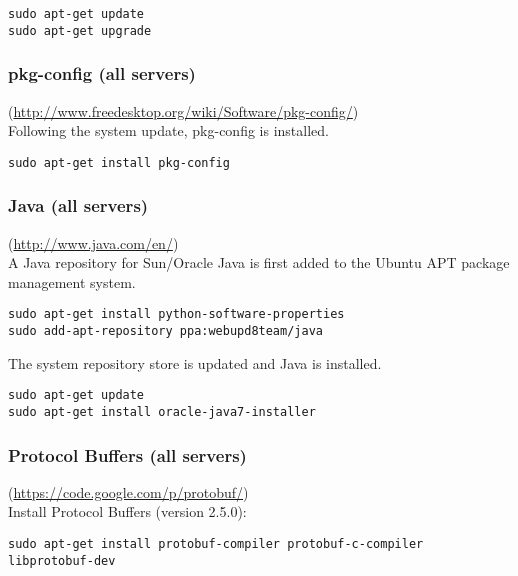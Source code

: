 \begin{verbatim}
sudo apt-get update
sudo apt-get upgrade
\end{verbatim}

\subsubsection{pkg-config (all servers)} (\url{http://www.freedesktop.org/wiki/Software/pkg-config/})\\
Following the system update, pkg-config is installed.
\begin{verbatim}
sudo apt-get install pkg-config
\end{verbatim}

\subsubsection{Java (all servers)} (\url{http://www.java.com/en/})\\
A Java repository for Sun/Oracle Java is first added to the Ubuntu APT package management system.
\begin{verbatim}
sudo apt-get install python-software-properties
sudo add-apt-repository ppa:webupd8team/java
\end{verbatim}
The system repository store is updated and Java is installed.
\begin{verbatim}
sudo apt-get update
sudo apt-get install oracle-java7-installer
\end{verbatim}


\subsubsection{Protocol Buffers (all servers)} (\url{https://code.google.com/p/protobuf/})\\
Install Protocol Buffers (version 2.5.0):
\begin{verbatim}
sudo apt-get install protobuf-compiler protobuf-c-compiler libprotobuf-dev
\end{verbatim}

